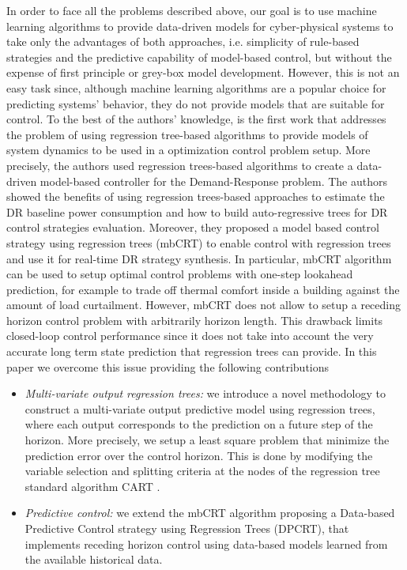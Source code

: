 \textcolor[rgb]{0.00,0.00,1.00}{In order to face all the problems described above, our goal is to use machine learning algorithms to provide data-driven models for cyber-physical systems to take only the advantages of both approaches, i.e. simplicity of rule-based strategies and the predictive capability of model-based control, but without the expense of first principle or grey-box model development. However, this is not an easy task since, although machine learning algorithms are a popular choice for predicting systems' behavior, they do not provide models that are suitable for control. To the best of the authors' knowledge, \cite{Behl201630} is the first work that addresses the problem of using regression tree-based algorithms to provide models of system dynamics to be used in a optimization control problem setup. More precisely, the authors used regression trees-based algorithms to create a data-driven model-based controller for the Demand-Response problem. The authors showed the benefits of using regression trees-based approaches to estimate the DR baseline power consumption and how to build auto-regressive trees for DR control strategies evaluation. Moreover, they proposed a model based control strategy using regression trees (mbCRT) to enable control with regression trees and use it for real-time DR strategy synthesis. In particular, mbCRT algorithm can be used to setup optimal control problems with one-step lookahead prediction, for example to trade off thermal comfort inside a building against the amount of load curtailment. However, mbCRT does not allow to setup a receding horizon control problem with arbitrarily horizon length. This drawback limits closed-loop control performance since it does not take into account the very accurate long term state prediction that regression trees can provide. In this paper we overcome this issue providing the following contributions 
\\
\begin{itemize}[leftmargin=1cm]
	\item \emph{Multi-variate output regression trees:} we introduce a novel methodology to construct a multi-variate output predictive model using regression trees, where each output corresponds to the prediction on a future step of the horizon. More precisely, we setup a least square problem that minimize the prediction error over the control horizon. This is done by modifying the variable selection and splitting criteria at the nodes of the regression tree standard algorithm CART \cite{BreimanFriedmanStoneEtAl1984}.
	\item \emph{Predictive control:} we extend the mbCRT algorithm proposing a Data-based Predictive Control strategy using Regression Trees (DPCRT), that implements receding horizon control using data-based models learned from the available historical data.

\end{itemize}}
